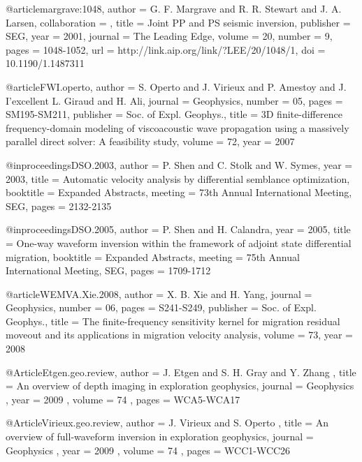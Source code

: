 {@article{margrave:1048,
author = {G. F. Margrave and R. R. Stewart and J. A. Larsen},
collaboration = {},
title = {Joint {PP} and {PS} seismic inversion},
publisher = {SEG},
year = {2001},
journal = {The Leading Edge},
volume = {20},
number = {9},
pages = {1048-1052},
url = {http://link.aip.org/link/?LEE/20/1048/1},
doi = {10.1190/1.1487311}
}







@article{FWI.operto,
  author = { S. Operto and J. Virieux and P. Amestoy and J.
I'excellent L. Giraud and H. Ali},
  journal = {Geophysics},
  number = {05},
  pages = {SM195-SM211},
  publisher = {Soc. of Expl. Geophys.},
  title = { 3D finite-difference frequency-domain modeling of
viscoacoustic wave propagation using a massively parallel direct
solver: A feasibility study},
  volume = {72},
  year = {2007}}

@inproceedings{DSO.2003,
  author    = {P. Shen and C. Stolk and W. Symes},
  year      = {2003},
  title     = {Automatic velocity analysis by differential semblance
optimization},
  booktitle = {Expanded Abstracts},
  meeting   = {73th Annual International Meeting, SEG},
  pages     = {2132-2135}
}

@inproceedings{DSO.2005,
  author    = {P. Shen and H. Calandra},
  year      = {2005},
  title     = {One-way waveform inversion within the framework of
adjoint state differential migration},
  booktitle = {Expanded Abstracts},
  meeting   = {75th Annual International Meeting, SEG},
  pages     = {1709-1712}
}

@article{WEMVA.Xie.2008,
  author = { X. B. Xie and H. Yang},
  journal = {Geophysics},
  number = {06},
  pages = {S241-S249},
  publisher = {Soc. of Expl. Geophys.},
  title = {The finite-frequency sensitivity kernel for migration
residual moveout and its applications in migration velocity analysis},
  volume = {73},
  year = {2008}}

@Article{Etgen.geo.review,
 author =  { J. Etgen and  S. H. Gray and Y. Zhang },
 title =   { An overview of depth imaging in exploration geophysics},
 journal = { Geophysics },
 year =    { 2009 },
 volume =  { 74 },
 pages =   { WCA5-WCA17 }
}

@Article{Virieux.geo.review,
 author =  { J. Virieux and S. Operto },
 title =   { An overview of full-waveform inversion in exploration geophysics},
 journal = { Geophysics },
 year =    { 2009 },
 volume =  { 74 },
 pages =   { WCC1-WCC26 }
}


}
